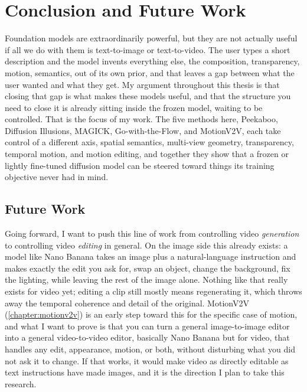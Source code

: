 \chapter{Conclusion and Future Work}
\label{chapter:conclusion}

Foundation models are extraordinarily powerful, but they are not actually useful if all we do with them is text-to-image or text-to-video. The user types a short description and the model invents everything else, the composition, transparency, motion, semantics, out of its own prior, and that leaves a gap between what the user wanted and what they get. My argument throughout this thesis is that closing that gap is what makes these models useful, and that the structure you need to close it is already sitting inside the frozen model, waiting to be controlled. That is the focus of my work. The five methods here, Peekaboo, Diffusion Illusions, MAGICK, Go-with-the-Flow, and MotionV2V, each take control of a different axis, spatial semantics, multi-view geometry, transparency, temporal motion, and motion editing, and together they show that a frozen or lightly fine-tuned diffusion model can be steered toward things its training objective never had in mind.

\section{Future Work}

Going forward, I want to push this line of work from controlling video \emph{generation} to controlling video \emph{editing} in general. On the image side this already exists: a model like Nano Banana takes an image plus a natural-language instruction and makes exactly the edit you ask for, swap an object, change the background, fix the lighting, while leaving the rest of the image alone. Nothing like that really exists for video yet; editing a clip still mostly means regenerating it, which throws away the temporal coherence and detail of the original. MotionV2V (\cref{chapter:motionv2v}) is an early step toward this for the specific case of motion, and what I want to prove is that you can turn a general image-to-image editor into a general video-to-video editor, basically Nano Banana but for video, that handles any edit, appearance, motion, or both, without disturbing what you did not ask it to change. If that works, it would make video as directly editable as text instructions have made images, and it is the direction I plan to take this research.
